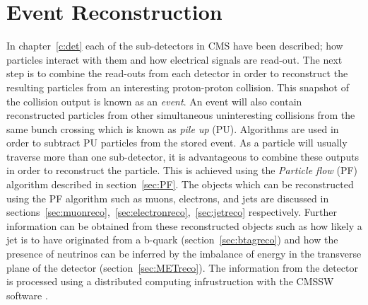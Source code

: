 \chapter{Event Reconstruction}
\label{c:recon}


In chapter~\ref{c:det} each of the sub-detectors in CMS have been described; how particles interact with them and how electrical signals are read-out. The next step is to combine the read-outs from each detector in order to reconstruct the resulting particles from an interesting proton-proton collision. This snapshot of the collision output is known as an \emph{event}. An event will also contain reconstructed particles from other simultaneous uninteresting collisions from the same bunch crossing which is known as \emph{pile up} (PU). Algorithms are used in order to subtract PU particles from the stored event. 
As a particle will usually traverse more than one sub-detector, it is advantageous to combine these outputs in order to reconstruct the particle. This is achieved using the \emph{Particle flow} (PF) algorithm described in section~\ref{sec:PF}. The objects which can be reconstructed using the PF algorithm such as muons, electrons, and jets are discussed in sections~\ref{sec:muonreco},~\ref{sec:electronreco},~\ref{sec:jetreco} respectively. Further information can be obtained from these reconstructed objects such as how likely a jet is to have originated from a b-quark (section~\ref{sec:btagreco}) and how the presence of neutrinos can be inferred by the imbalance of energy in the transverse plane of the detector (section~\ref{sec:METreco}).  
The information from the detector is processed using a distributed computing infrustruction with the CMSSW software .




